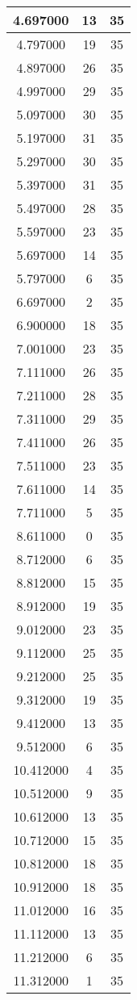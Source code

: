 \begin{longtable}[htbp]{|c|c|c|}
4.697000 & 13 & 35 \\ \hline
4.797000 & 19 & 35 \\ \hline
4.897000 & 26 & 35 \\ \hline
4.997000 & 29 & 35 \\ \hline
5.097000 & 30 & 35 \\ \hline
5.197000 & 31 & 35 \\ \hline
5.297000 & 30 & 35 \\ \hline
5.397000 & 31 & 35 \\ \hline
5.497000 & 28 & 35 \\ \hline
5.597000 & 23 & 35 \\ \hline
5.697000 & 14 & 35 \\ \hline
5.797000 & 6 & 35 \\ \hline
6.697000 & 2 & 35 \\ \hline
6.900000 & 18 & 35 \\ \hline
7.001000 & 23 & 35 \\ \hline
7.111000 & 26 & 35 \\ \hline
7.211000 & 28 & 35 \\ \hline
7.311000 & 29 & 35 \\ \hline
7.411000 & 26 & 35 \\ \hline
7.511000 & 23 & 35 \\ \hline
7.611000 & 14 & 35 \\ \hline
7.711000 & 5 & 35 \\ \hline
8.611000 & 0 & 35 \\ \hline
8.712000 & 6 & 35 \\ \hline
8.812000 & 15 & 35 \\ \hline
8.912000 & 19 & 35 \\ \hline
9.012000 & 23 & 35 \\ \hline
9.112000 & 25 & 35 \\ \hline
9.212000 & 25 & 35 \\ \hline
9.312000 & 19 & 35 \\ \hline
9.412000 & 13 & 35 \\ \hline
9.512000 & 6 & 35 \\ \hline
10.412000 & 4 & 35 \\ \hline
10.512000 & 9 & 35 \\ \hline
10.612000 & 13 & 35 \\ \hline
10.712000 & 15 & 35 \\ \hline
10.812000 & 18 & 35 \\ \hline
10.912000 & 18 & 35 \\ \hline
11.012000 & 16 & 35 \\ \hline
11.112000 & 13 & 35 \\ \hline
11.212000 & 6 & 35 \\ \hline
11.312000 & 1 & 35 \\ \hline
\end{longtable}
